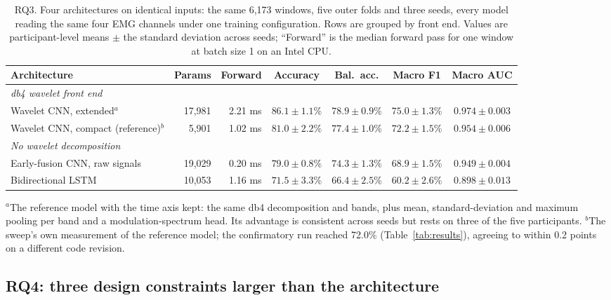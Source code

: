\documentclass[pdflatex,sn-nature,iicol]{sn-jnl}
\begin{document}
\begin{table}[t]
  \centering
  \caption{RQ3. Four architectures on identical inputs: the same 6,173 windows, five outer folds and three seeds, every model reading the same four EMG channels under one training configuration. Rows are grouped by front end. Values are participant-level means $\pm$ the standard deviation across seeds; ``Forward'' is the median forward pass for one window at batch size 1 on an Intel CPU.}
  \label{tab:architectures}
  \footnotesize
  \begin{tabular*}{\textwidth}{@{\extracolsep{\fill}}lrrcccc@{}}
    \toprule
    Architecture & Params & Forward & Accuracy & Bal.\ acc. & Macro F1 & Macro AUC \\
    \midrule
    \multicolumn{7}{l}{\emph{db4 wavelet front end}}\\
    Wavelet CNN, extended$^{a}$ & 17,981 & 2.21 ms & $\mathbf{86.1 \pm 1.1}$\% & $\mathbf{78.9 \pm 0.9}$\% & $\mathbf{75.0 \pm 1.3}$\% & $\mathbf{0.974 \pm 0.003}$ \\
    Wavelet CNN, compact (reference)$^{b}$ & 5,901 & 1.02 ms & $81.0 \pm 2.2$\% & $77.4 \pm 1.0$\% & $72.2 \pm 1.5$\% & $0.954 \pm 0.006$ \\
    \midrule
    \multicolumn{7}{l}{\emph{No wavelet decomposition}}\\
    Early-fusion CNN, raw signals & 19,029 & 0.20 ms & $79.0 \pm 0.8$\% & $74.3 \pm 1.3$\% & $68.9 \pm 1.5$\% & $0.949 \pm 0.004$ \\
    Bidirectional LSTM & 10,053 & 1.16 ms & $71.5 \pm 3.3$\% & $66.4 \pm 2.5$\% & $60.2 \pm 2.6$\% & $0.898 \pm 0.013$ \\
    \bottomrule
  \end{tabular*}
  \begin{flushleft}\footnotesize
  $^{a}$The reference model with the time axis kept: the same db4 decomposition and bands, plus mean, standard-deviation and maximum pooling per band and a modulation-spectrum head. Its advantage is consistent across seeds but rests on three of the five participants.
  $^{b}$The sweep's own measurement of the reference model; the confirmatory run reached 72.0\% (Table~\ref{tab:results}), agreeing to within 0.2 points on a different code revision.
  \end{flushleft}
\end{table}

\subsection{RQ4: three design constraints larger than the architecture}
\label{sec:constraints}
\end{document}
